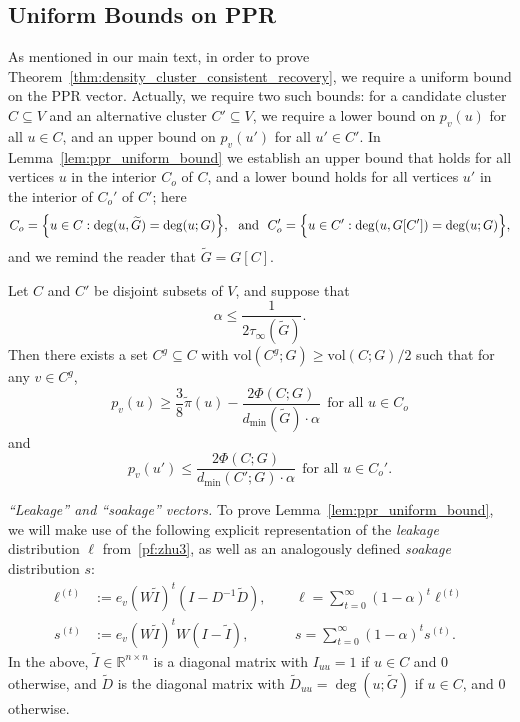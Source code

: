 \documentclass[twoside,11pt]{article}
\newcommand{\Reals}{\mathbb{R}}
\newcommand{\1}{\mathbf{1}}
\newcommand{\wt}[1]{\widetilde{#1}}
\newcommand{\vol}{\mathrm{vol}}
\begin{document}
\subsection{Uniform Bounds on PPR}
\label{subsec:ppr_uniform_bounds}
As mentioned in our main text, in order to prove Theorem~\ref{thm:density_cluster_consistent_recovery}, we require a uniform bound on the PPR vector. Actually, we require two such bounds: for a candidate cluster $C \subseteq V$ and an alternative cluster $C' \subseteq V$, we require a lower bound on $p_v(u)$ for all $u \in C$, and an upper bound on $p_v(u')$ for all $u' \in C'$. In Lemma~\ref{lem:ppr_uniform_bound} we establish an upper bound that holds for all vertices $u$ in the interior $C_{o}$ of $C$, and a lower bound holds for all vertices $u'$ in the interior of $C_{o}'$ of $C'$; here
\begin{equation*}
C_{o} = \Bigl\{u \in C: \deg(u,\wt{G}) =  \deg(u;G)\Bigr\},~~\textrm{and}~~C_{o}'= \Bigl\{u \in C': \deg(u,G[C']) =  \deg(u;G)\Bigr\},
\end{equation*}
and we remind the reader that $\wt{G} = G[C]$. 
\begin{lemma}
	\label{lem:ppr_uniform_bound}
	Let $C$ and $C'$ be disjoint subsets of $V$, and suppose that
	\begin{equation*}
	\alpha \leq \frac{1}{2\tau_{\infty}(\wt{G})}.
	\end{equation*}
	Then there exists a set $C^g \subseteq C$ with $\vol(C^g;G) \geq \vol(C;G)/2$ such that for any $v \in C^g$,
	\begin{equation}
	\label{eqn:ppr_uniform_bound_C}
	p_v(u) \geq \frac{3}{8}\wt{\pi}(u) - \frac{2 \Phi(C;G)}{d_{\min}(\wt{G})\cdot \alpha}~~\textrm{for all $u \in C_{o}$}
	\end{equation}
	and
	\begin{equation}
	\label{eqn:ppr_uniform_bound_Cprime}
	p_v(u') \leq \frac{2\Phi(C;G)}{d_{\min}(C';G) \cdot \alpha}~~\textrm{for all $u \in C_{o}'$.}
	\end{equation}
\end{lemma}

\noindent\emph{``Leakage'' and ``soakage'' vectors.} To prove Lemma~\ref{lem:ppr_uniform_bound}, we will make use of the following explicit representation of the \emph{leakage} distribution $\ell$ from~\eqref{pf:zhu3}, as well as an analogously defined \emph{soakage} distribution $s$:
\begin{equation}
\label{eqn:leakage_soakage}
\begin{aligned}
\ell^{(t)} & := e_v(W \wt{I})^t(I - D^{-1}\wt{D}),~~&& \ell = \sum_{t = 0}^{\infty} (1 - \alpha)^t \ell^{(t)} \\
s^{(t)} & := e_v(W \wt{I})^t W (I - \wt{I}),~~&& s = \sum_{t = 0}^{\infty} (1 - \alpha)^t s^{(t)}.
\end{aligned}
\end{equation}
In the above, $\wt{I} \in \Reals^{n \times n}$ is a diagonal matrix with $I_{uu} = 1$ if $u \in C$ and $0$ otherwise, and $\wt{D}$ is the diagonal matrix with $\wt{D}_{uu} = \deg(u;\wt{G})$ if $u \in C$, and $0$ otherwise. 
\end{document}
